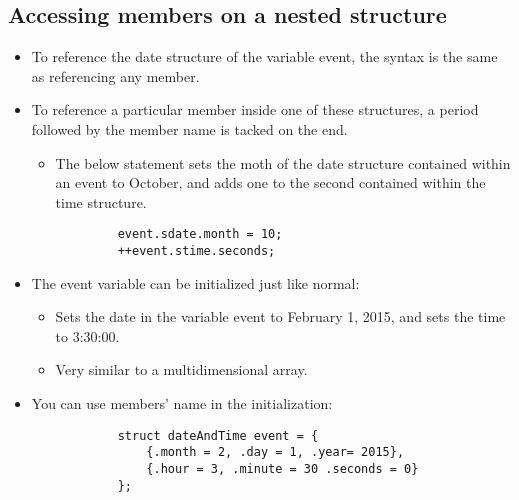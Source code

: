 \subsection{Accessing members on a nested structure}
\begin{itemize}
    \item To reference the date structure of the variable event, the syntax is the same as referencing any member. 
    \item To reference a particular member inside one of these structures, a period followed by the member name is tacked on the end. 
        \begin{itemize}
            \item The below statement sets the moth of the date structure contained within an event to October, and adds one to the second contained within the time structure. 
        \end{itemize}
        \begin{verbatim}
            event.sdate.month = 10;
            ++event.stime.seconds;
        \end{verbatim}
    
    \item The event variable can be initialized just like normal:
        \begin{itemize}
            \item Sets the date in the variable event to February 1, 2015, and sets the time to 3:30:00.
            \item Very similar to a multidimensional array. 
        \end{itemize}
    
    \item You can use members' name in the initialization:
        \begin{verbatim}
            struct dateAndTime event = {
                {.month = 2, .day = 1, .year= 2015},
                {.hour = 3, .minute = 30 .seconds = 0}
            };
        \end{verbatim}
\end{itemize}

